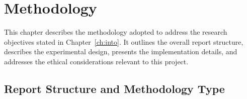 
\chapter{Methodology}
\label{ch:method}

This chapter describes the methodology adopted to address the research objectives 
stated in Chapter~\ref{ch:into}. It outlines the overall report structure, 
describes the experimental design, presents the implementation details, and 
addresses the ethical considerations relevant to this project.

\section{Report Structure and Methodology Type}
\label{sec:method_structure}


